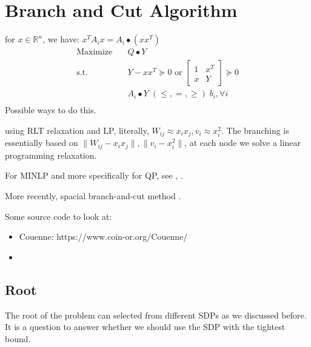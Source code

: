 \documentclass[../main]{subfiles}
\begin{document}
\section{Branch and Cut Algorithm}


for \(x \in \mathbb{R}^{n}\), we have: \(x^{T} A_{i} x = A_i \bullet (xx^T)\)
\begin{equation}
    \begin{aligned}
        \mathrm{Maximize}\quad & Q\bullet Y                                                        \\
        \mathrm{s.t.}  \quad   & Y-xx^T \succeq 0 \text { or } \begin{bmatrix} 1 & x^{T} \\ x & Y \end{bmatrix} \succeq 0 \\
                               & A_i \bullet Y \; (\le, =, \ge) \; b_i, \forall i                  \\
    \end{aligned}
\end{equation}
Possible ways to do this.

\cite{audet_branch_2000} using RLT relaxation and LP, literally, \(W_{ij} \approx x_i x_j , v_i \approx x_i^2\). The branching is essentially based on \(\|W_{ij} - x_ix_j\|, \|v_i - x_i^2\|\), at each node we solve a linear programming relaxation.

For MINLP and more specifically for QP, see \cite{belotti_mixed-integer_2013}, \cite{misener_glomiqo_2013}.

More recently, spacial branch-and-cut method \cite{chen_spatial_2017}.


Some source code to look at:

\begin{itemize}
    \item Couenne: https://www.coin-or.org/Couenne/
    \item
\end{itemize}

\subsection{Root}

The root of the problem can selected from different SDPs as we discussed before. It is a question to answer whether we should use the SDP with the tightest bound.
\end{document}
